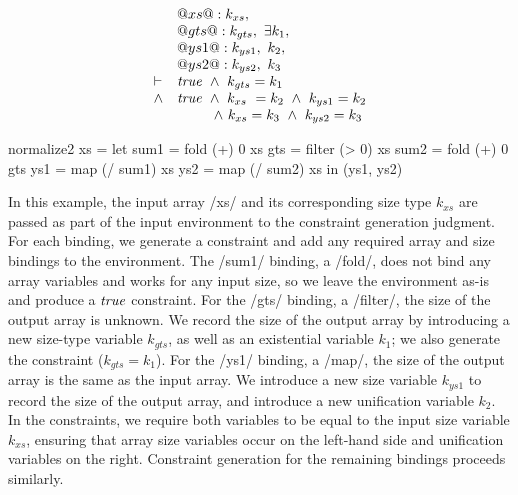 \begin{minipage}{0.5\textwidth}
$$
\begin{array}{ll}
   & @xs @ : k_{xs},~
\\ & @gts@ : k_{gts},~ \exists k_1,
\\ & @ys1@ : k_{ys1},~ k_2,
\\ & @ys2@ : k_{ys2},~ k_3
\\
\vdash & \mathit{true} 
        ~\wedge~  k_{gts} = k_1
\\ \wedge & \mathit{true}
        ~ \wedge~  k_{xs}  ~= k_2
        ~ \wedge~  k_{ys1}  = k_2 
\\     &~~~~~~~\; 
          \wedge~  k_{xs}   = k_3
        ~ \wedge~  k_{ys2}  = k_3
\end{array}
$$
\end{minipage}
\begin{minipage}{0.5\textwidth}
\begin{haskell}
normalize2 xs
 = let sum1 = fold   (+)  0   xs
       gts  = filter (>   0)  xs
       sum2 = fold   (+)  0   gts
       ys1  = map    (/ sum1) xs
       ys2  = map    (/ sum2) xs
   in (ys1, ys2)
\end{haskell}
\end{minipage}

In this example, the input array \Hs/xs/ and its corresponding size type $k_{xs}$ are passed as part of the input environment to the constraint generation judgment.
For each binding, we generate a constraint and add any required array and size bindings to the environment.
The \Hs/sum1/ binding, a \Hs/fold/, does not bind any array variables and works for any input size, so we leave the environment as-is and produce a $\mathit{true}$ constraint.
For the \Hs/gts/ binding, a \Hs/filter/, the size of the output array is unknown.
We record the size of the output array by introducing a new size-type variable $k_{gts}$, as well as an existential variable $k_1$; we also generate the constraint ($k_{gts} = k_1$).
For the \Hs/ys1/ binding, a \Hs/map/, the size of the output array is the same as the input array.
We introduce a new size variable $k_{ys1}$ to record the size of the output array, and introduce a new unification variable $k_2$.
In the constraints, we require both variables to be equal to the input size variable $k_{xs}$, ensuring that array size variables occur on the left-hand side and unification variables on the right.
Constraint generation for the remaining bindings proceeds similarly.


